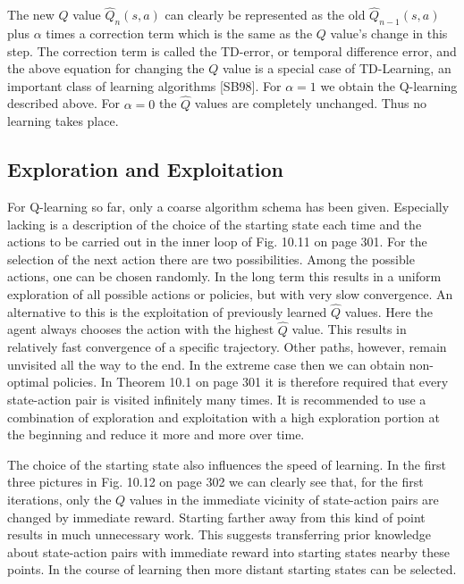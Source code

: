 \documentclass[10pt]{book}
\begin{document}
The new $Q$ value $\hat{Q}_{n}(s, a)$ can clearly be represented as the old $\hat{Q}_{n-1}(s, a)$ plus $\alpha$ times a correction term which is the same as the $Q$ value's change in this step. The correction term is called the TD-error, or temporal difference error, and the above equation for changing the $Q$ value is a special case of TD-Learning, an important class of learning algorithms [SB98]. For $\alpha=1$ we obtain the Q-learning described above. For $\alpha=0$ the $\hat{Q}$ values are completely unchanged. Thus no learning takes place.

\subsection{Exploration and Exploitation}
For Q-learning so far, only a coarse algorithm schema has been given. Especially lacking is a description of the choice of the starting state each time and the actions to be carried out in the inner loop of Fig. 10.11 on page 301. For the selection of the next action there are two possibilities. Among the possible actions, one can be chosen randomly. In the long term this results in a uniform exploration of all possible actions or policies, but with very slow convergence. An alternative to this is the exploitation of previously learned $\hat{Q}$ values. Here the agent always chooses the action with the highest $\hat{Q}$ value. This results in relatively fast convergence of a specific trajectory. Other paths, however, remain unvisited all the way to the end. In the extreme case then we can obtain non-optimal policies. In Theorem 10.1 on page 301 it is therefore required that every state-action pair is visited infinitely many times. It is recommended to use a combination of exploration and exploitation with a high exploration portion at the beginning and reduce it more and more over time.

The choice of the starting state also influences the speed of learning. In the first three pictures in Fig. 10.12 on page 302 we can clearly see that, for the first iterations, only the $Q$ values in the immediate vicinity of state-action pairs are changed by immediate reward. Starting farther away from this kind of point results in much unnecessary work. This suggests transferring prior knowledge about state-action pairs with immediate reward into starting states nearby these points. In the course of learning then more distant starting states can be selected.
\end{document}
